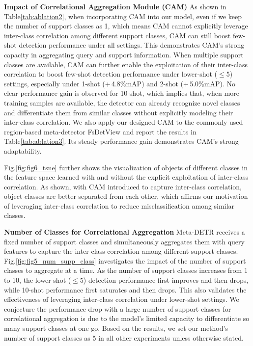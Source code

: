 \documentclass[letterpaper]{article} \usepackage{aaai22}  \usepackage{times}  \usepackage{helvet}  \usepackage{courier}  \usepackage[hyphens]{url}  \usepackage{graphicx} \urlstyle{rm} \def\UrlFont{\rm}  \usepackage{natbib}  \usepackage{caption} \DeclareCaptionStyle{ruled}{labelfont=normalfont,labelsep=colon,strut=off} \frenchspacing  \setlength{\pdfpagewidth}{8.5in}  \setlength{\pdfpageheight}{11in}  \usepackage{algorithm}
\begin{document}
\vspace{+0.5mm}
\smallskip
\noindent\textbf{Impact of Correlational Aggregation Module (CAM)\;\;}
As shown in Table\;\ref{tab:ablation2}, when incorporating CAM into our model, even if we keep the number of support classes as 1, which means CAM cannot explicitly leverage inter-class correlation among different support classes, CAM can still boost few-shot detection performance under all settings. This demonstrates CAM's strong capacity in aggregating query and support information. When multiple support classes are available, CAM can further enable the exploitation of their inter-class correlation to boost few-shot detection performance under lower-shot ($\leq$5) settings, especially under 1-shot (+\,4.8\%\;mAP) and 2-shot (+\,5.0\%\;mAP). No clear performance gain is observed for 10-shot, which implies that, when more training samples are available, the detector can already recognize novel classes and differentiate them from similar classes without explicitly modeling their inter-class correlation.
We also apply our designed CAM to the commonly used region-based meta-detector FsDetView and report the results in Table\;\ref{tab:ablation3}. Its steady performance gain demonstrates CAM's strong adaptability.


Fig.\;\ref{fig:fig6_tsne} further shows the visualization of objects of different classes in the feature  space learned with and without the explicit exploitation of inter-class correlation. As shown, with CAM introduced to capture inter-class correlation, object classes are better separated from each other, which affirms our motivation of leveraging inter-class correlation to reduce misclassification among similar classes.




\smallskip
\noindent\textbf{Number of Classes for Correlational Aggregation\;\;}
Meta-DETR receives a fixed number of support classes and simultaneously aggregates them with query features to capture the inter-class correlation among different support classes. Fig.\;\ref{fig:fig5_num_supp_class} investigates the impact of the number of support classes to aggregate at a time. As the number of support classes increases from 1 to 10, the lower-shot ($\leq$5) detection performance first improves and then drops, while 10-shot performance first saturates and then drops. This also validates the effectiveness of leveraging inter-class correlation under lower-shot settings. We conjecture the performance drop with a large number of support classes for correlational aggregation is due to the model's limited capacity to differentiate so many support classes at one go. Based on the results, we set our method's number of support classes as 5 in all other experiments unless otherwise stated.
\end{document}

